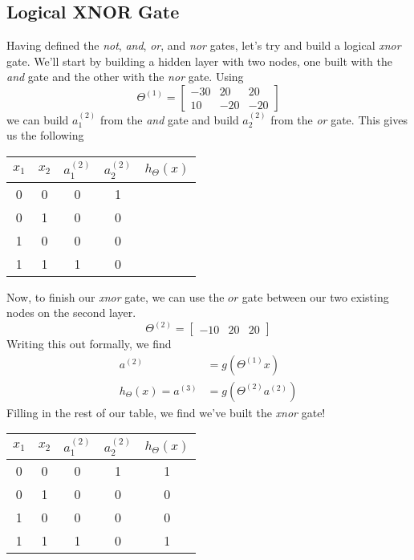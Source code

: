 \subsection{Logical XNOR Gate}
Having defined the \textit{not}, \textit{and}, \textit{or}, and \textit{nor} gates, let's try and build a logical \textit{xnor} gate. We'll start by building a hidden layer with two nodes, one built with the \textit{and} gate and the other with the \textit{nor} gate. Using 
$$
\Theta^{(1)} = \left[\begin{array}{ccc} -30 & 20 & 20 \\ 10 & -20 & -20 \end{array}\right]
$$
we can build $a_1^{(2)}$ from the \textit{and} gate and build $a_2^{(2)}$ from the \textit{or} gate. This gives us the following 
\begin{center}
\begin{tabular}{c c | c c | c}
$x_1$ & $x_2$ & $ a_1^{(2)}$ & $a_2^{(2)}$ & $h_\Theta\left(x\right)$ \\ \hline
0 & 0 & 0 & 1 & {} \\
0 & 1 & 0 & 0 & {} \\
1 & 0 & 0 & 0 & {} \\
1 & 1 & 1 & 0 & {}
\end{tabular}
\end{center}
Now, to finish our \textit{xnor} gate, we can use the $\textit{or}$ gate between our two existing nodes on the second layer. 
$$
\Theta^{(2)} = \left[\begin{array}{ccc} -10 & 20 & 20 \end{array}\right]
$$
Writing this out formally, we find
\begin{align*}
a^{(2)} &= g\left(\Theta^{(1)} x\right) \\
h_\Theta\left(x\right) = a^{(3)} &= g\left(\Theta^{(2)} a^{(2)}\right)
\end{align*}
Filling in the rest of our table, we find we've built the \textit{xnor} gate!
\begin{center}
\begin{tabular}{c c | c c | c}
$x_1$ & $x_2$ & $ a_1^{(2)}$ & $a_2^{(2)}$ & $h_\Theta\left(x\right)$ \\ \hline
0 & 0 & 0 & 1 & 1 \\
0 & 1 & 0 & 0 & 0 \\
1 & 0 & 0 & 0 & 0 \\
1 & 1 & 1 & 0 & 1
\end{tabular}
\end{center}


